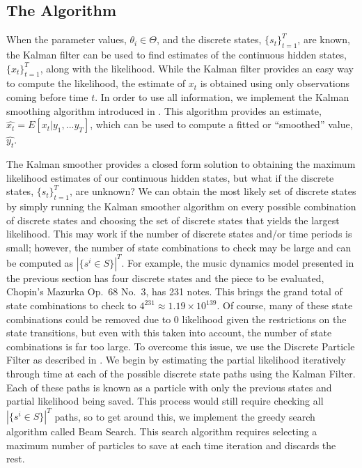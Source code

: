 \documentclass[12pt]{article}
\begin{document}
\subsection{The Algorithm}

When the parameter values, \(\theta_i \in \Theta\), and the discrete
states, \(\{s_t\}^T_{t=1}\), are known, the Kalman filter
\citep{kalman_new_1960} can be used to find estimates of the continuous
hidden states, \(\{x_t\}_{t=1}^T\), along with the likelihood. While the
Kalman filter provides an easy way to compute the likelihood, the
estimate of \(x_t\) is obtained using only observations coming before
time \(t\). In order to use all information, we implement the Kalman
smoothing algorithm introduced in \citep{rauch_maximum_1965}. This
algorithm provides an estimate, \(\hat{x_t} = E[x_t|y_1,...y_T]\), which
can be used to compute a fitted or ``smoothed'' value, \(\hat{y_t}\).

The Kalman smoother provides a closed form solution to obtaining the
maximum likelihood estimates of our continuous hidden states, but what
if the discrete states, \(\{s_t\}^T_{t=1}\), are unknown? We can obtain
the most likely set of discrete states by simply running the Kalman
smoother algorithm on every possible combination of discrete states and
choosing the set of discrete states that yields the largest likelihood.
This may work if the number of discrete states and/or time periods is
small; however, the number of state combinations to check may be large
and can be computed as \(|\{s^i \in S\}|^T\). For example, the music
dynamics model presented in the previous section has four discrete
states and the piece to be evaluated, Chopin's Mazurka Op.~68 No.~3, has
231 notes. This brings the grand total of state combinations to check to
\(4^{231}\approx1.19\times 10^{139}\). Of course, many of these state
combinations could be removed due to 0 likelihood given the restrictions
on the state transitions, but even with this taken into account, the
number of state combinations is far too large. To overcome this issue,
we use the Discrete Particle Filter as described in
\cite{mcdonald_markov-switching_2019}. We begin by estimating the
partial likelihood iteratively through time at each of the possible
discrete state paths using the Kalman Filter. Each of these paths is
known as a particle with only the previous states and partial likelihood
being saved. This process would still require checking all
\(|\{s^i \in S\}|^T\) paths, so to get around this, we implement the
greedy search algorithm called Beam Search. This search algorithm
requires selecting a maximum number of particles to save at each time
iteration and discards the rest.
\end{document}
